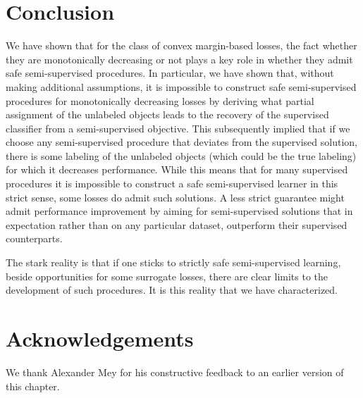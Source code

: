 \documentclass[twoside]{memoir}\usepackage[]{graphicx}\usepackage{xcolor}
\begin{document}
\section{Conclusion}
We have shown that for the class of convex margin-based losses, the fact whether they are monotonically decreasing or not plays a key role in whether they admit safe semi-supervised procedures. In particular, we have shown that, without making additional assumptions, it is impossible to construct safe semi-supervised procedures for monotonically decreasing losses by deriving what partial assignment of the unlabeled objects leads to the recovery of the supervised classifier from a semi-supervised objective. This subsequently implied that if we choose any semi-supervised procedure that deviates from the supervised solution, there is some labeling of the unlabeled objects (which could be the true labeling) for which it decreases performance. While this means that for many supervised procedures it is impossible to construct a safe semi-supervised learner in this strict sense, some losses do admit such solutions. 
A less strict guarantee might admit performance improvement by aiming for semi-supervised solutions that in expectation rather than on any particular dataset, outperform their supervised counterparts. 

The stark reality is that if one sticks to strictly safe semi-supervised learning, beside opportunities for some surrogate losses, there are clear limits to the development of such procedures.  It is this reality that we have characterized.

\section*{Acknowledgements}

We thank Alexander Mey for his constructive feedback to an earlier version of this chapter.
\end{document}
